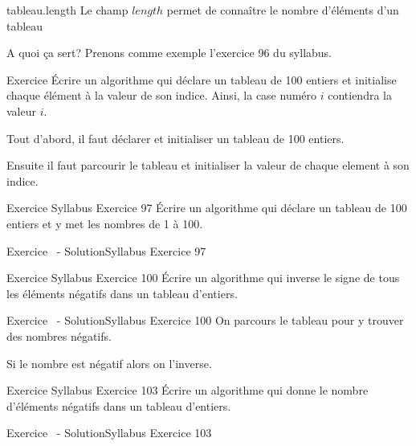 \begin{frame}{tableau.length}
    \pause
    Le champ $length$ permet de connaître le nombre d'éléments d'un tableau
    
\end{frame}

\begin{frame}{A quoi ça sert?}
    \pause
    Prenons comme exemple l'exercice 96 du syllabus.
    \begin{block}{Exercice}
        Écrire un algorithme qui déclare un tableau de 100 entiers
        et initialise chaque élément à la valeur de son indice.
        Ainsi, la case numéro $i$ contiendra la valeur $i$.
    \end{block}

    \pause
    Tout d'abord, il faut déclarer et initialiser un tableau de 100 entiers.
    

    \pause
    Ensuite il faut parcourir le tableau et initialiser la valeur de chaque element à son indice.
    
\end{frame}

\begin{frame}{Exercice \theexercice}{Syllabus Exercice 97}
    Écrire un algorithme qui déclare un tableau de 100 entiers
    et y met les nombres de 1 à 100.
\end{frame}

\begin{frame}{Exercice \theexercice~- Solution}{Syllabus Exercice 97}
    
\end{frame}

\begin{frame}{Exercice \theexercice}{Syllabus Exercice 100}
    Écrire un algorithme qui
    inverse le signe de tous les éléments négatifs dans un tableau d’entiers.
\end{frame}

\begin{frame}{Exercice \theexercice~- Solution}{Syllabus Exercice 100}
    On parcours le tableau pour y trouver des nombres négatifs.
    
    Si le nombre est négatif alors on l'inverse.
\end{frame}

\begin{frame}{Exercice \theexercice}{Syllabus Exercice 103}
    Écrire un algorithme qui
    donne le nombre d’éléments négatifs dans un tableau d’entiers.
\end{frame}

\begin{frame}{Exercice \theexercice~- Solution}{Syllabus Exercice 103}
    
\end{frame}